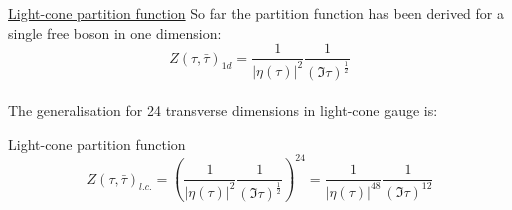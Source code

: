 \documentclass[11pt,aspectratio=169]{beamer}
\begin{document}




\begin{frame}{\underline{Light-cone partition function}}
	So far the partition function has been derived for a single free boson in one dimension:
	\begin{equation}
		Z(\tau, \bar{\tau})_{1d} = \frac{1}{|\eta(\tau)|^2}\frac{1}{(\Im\tau)^{\frac{1}{2}}}
	\end{equation} 
	\\
	The generalisation for 24 transverse dimensions in light-cone gauge is:
	\begin{block}{Light-cone partition function}
		\begin{equation}
			Z(\tau, \bar{\tau})_{l.c.} = (\frac{1}{|\eta(\tau)|^2}\frac{1}{(\Im\tau)^{\frac{1}{2}}})^{24} = \frac{1}{|\eta(\tau)|^{48}}\frac{1}{(\Im\tau)^{12}}
		\end{equation}
	\end{block}
	
\end{frame}
\end{document}
